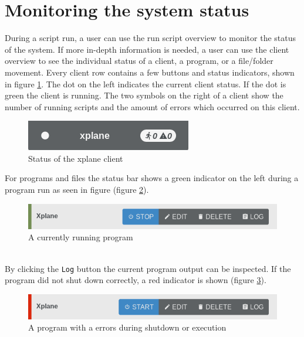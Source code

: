 \documentclass[accentcolor=tud1a, paper=a4, colorback]{tudreport}
\begin{document}
	\section{Monitoring the system status}
	During a script run, a user can use the run script overview to monitor the status of the
	system. If more in-depth information is needed, a user can use the client overview to
	see the individual status of a client, a program, or a file/folder movement.
	Every client row contains a few buttons and status indicators, shown in figure \ref{client_status}.
	The dot on the left indicates the current client status. If the dot is
	green the client is running. The two symbols on the right of a client 
	show the number of running scripts and the amount of errors which occurred on this client.
	\begin{figure}[h]
		\centering
		\includegraphics[width=.3\textwidth]{client_status}
		\caption{Status of the xplane client}
		\label{client_status}
	\end{figure}
	For programs and files the status bar shows a green indicator on the left during a program run as seen in figure (figure \ref{running_program}).
	\begin{figure}[h]
		\centering
		\includegraphics[width=.6\textwidth]{running_program}
		\caption{A currently running program}
		\label{running_program}
	\end{figure}\\
	By clicking the \texttt{Log} button the current program output can be inspected.
	If the program did not shut down correctly, a red indicator is shown (figure \ref{failed_program}).
	\begin{figure}[h]
		\centering
		\includegraphics[width=.6\textwidth]{failed_program}
		\caption{A program with a errors during shutdown or execution}
		\label{failed_program}
	\end{figure}\\

	\clearpage
	\printindex
\end{document}
